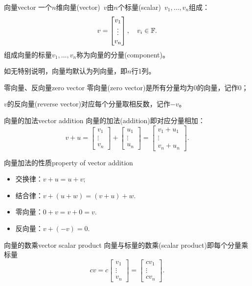 \begin{definition}{向量}{vector}
	一个$n$维向量(vector)~$v$由$n$个标量(scalar)~$v_1,\ldots,v_n$组成：
	\[
		v=\begin{bmatrix}
			v_1\\\vdots\\v_n
		\end{bmatrix},\quad v_i\in\mathbb F.
	\]
	组成向量的标量$v_1,\ldots,v_n$称为向量的分量(component)。
\end{definition}
如无特别说明，向量均默认为列向量，即$n$行1列。
\begin{definition}{零向量、反向量}{zero vector}
	零向量(zero vector)是所有分量均为0的向量，记作0；
	
	$v$的反向量(reverse vector)对应每个分量取相反数，记作$-v$。
\end{definition}
\begin{definition}{向量的加法}{vector addition}
	向量的加法(addition)即对应分量相加：%
	\[
		v+u=\begin{bmatrix}
			v_1\\\vdots\\v_n
		\end{bmatrix}+\begin{bmatrix}
			u_1\\\vdots\\u_n
		\end{bmatrix}=\begin{bmatrix}
			v_1+u_1\\\vdots\\v_n+u_n
		\end{bmatrix}.
	\]
\end{definition}
\begin{theorem}{向量加法的性质}{property of vector addition}
    \begin{itemize}
    	\item 交换律：$v+u=u+v;$
    	\item 结合律：$v+(u+w)=(v+u)+w.$
    	\item 零向量：$0+v=v+0=v.$
    	\item 反向量：$v+(-v)=0.$
    \end{itemize}
\end{theorem}
\begin{definition}{向量的数乘}{vector scalar product}
	向量与标量的数乘(scalar product)即每个分量乘标量
	\[
		cv=c\begin{bmatrix}
			v_1\\\vdots\\v_n
		\end{bmatrix}=\begin{bmatrix}
			cv_1\\\vdots\\cv_n
		\end{bmatrix}.
	\]
\end{definition}
